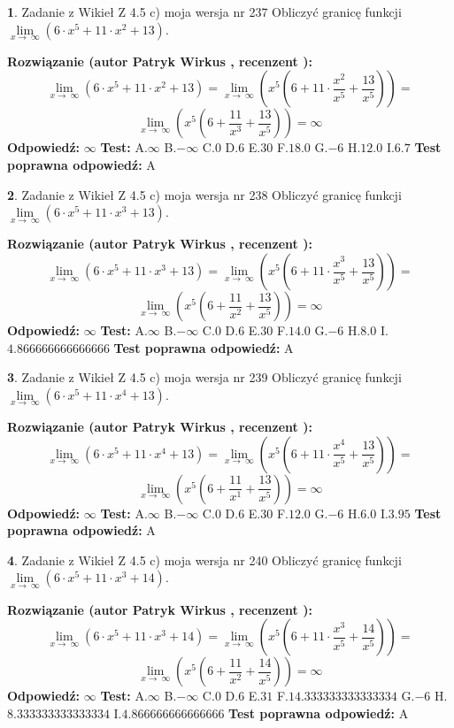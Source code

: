 \documentclass[12pt, a4paper]{article}
\theoremstyle{definition} %
\newtheorem{zad}{}
\newcommand{\zadStart}[1]{\begin{zad}#1\newline}
\newcommand{\zadStop}{\end{zad}}
\newcommand{\rozwStart}[2]{\noindent \textbf{Rozwiązanie (autor #1 , recenzent #2): }\newline}
\newcommand{\rozwStop}{\newline}
\newcommand{\odpStart}{\noindent \textbf{Odpowiedź:}\newline}
\newcommand{\odpStop}{\newline}
\newcommand{\testStart}{\noindent \textbf{Test:}\newline}
\newcommand{\testStop}{\newline}
\newcommand{\kluczStart}{\noindent \textbf{Test poprawna odpowiedź:}\newline}
\newcommand{\kluczStop}{\newline}
\begin{document}
\zadStart{Zadanie z Wikieł Z 4.5 c) moja wersja nr 237}
Obliczyć granicę funkcji  $\lim\limits_{x\to\ \infty}(6 \cdot x^{5}+11 \cdot x^{2}+13)$.
\zadStop
\rozwStart{Patryk Wirkus}{}
$$\lim\limits_{x\to\ \infty}(6 \cdot x^{5}+11 \cdot x^{2}+13) = \lim\limits_{x\to\ \infty}(x^{5}(6 +11 \cdot \frac{x^{2}}{x^{5}}+\frac{13}{x^{5}})) =$$ $$\lim\limits_{x\to\ \infty}(x^{5}(6 +\frac{11}{x^{3}}+\frac{13}{x^{5}})) =\infty$$
\rozwStop
\odpStart
$\infty$
\odpStop
\testStart
A.$\infty$ B.$-\infty$ C.$0$ D.$6$ E.$30$
F.$18.0$ G.$-6$
H.$12.0$
I.$6.7$
\testStop
\kluczStart
A
\kluczStop



\zadStart{Zadanie z Wikieł Z 4.5 c) moja wersja nr 238}
Obliczyć granicę funkcji  $\lim\limits_{x\to\ \infty}(6 \cdot x^{5}+11 \cdot x^{3}+13)$.
\zadStop
\rozwStart{Patryk Wirkus}{}
$$\lim\limits_{x\to\ \infty}(6 \cdot x^{5}+11 \cdot x^{3}+13) = \lim\limits_{x\to\ \infty}(x^{5}(6 +11 \cdot \frac{x^{3}}{x^{5}}+\frac{13}{x^{5}})) =$$ $$\lim\limits_{x\to\ \infty}(x^{5}(6 +\frac{11}{x^{2}}+\frac{13}{x^{5}})) =\infty$$
\rozwStop
\odpStart
$\infty$
\odpStop
\testStart
A.$\infty$ B.$-\infty$ C.$0$ D.$6$ E.$30$
F.$14.0$ G.$-6$
H.$8.0$
I.$4.866666666666666$
\testStop
\kluczStart
A
\kluczStop



\zadStart{Zadanie z Wikieł Z 4.5 c) moja wersja nr 239}
Obliczyć granicę funkcji  $\lim\limits_{x\to\ \infty}(6 \cdot x^{5}+11 \cdot x^{4}+13)$.
\zadStop
\rozwStart{Patryk Wirkus}{}
$$\lim\limits_{x\to\ \infty}(6 \cdot x^{5}+11 \cdot x^{4}+13) = \lim\limits_{x\to\ \infty}(x^{5}(6 +11 \cdot \frac{x^{4}}{x^{5}}+\frac{13}{x^{5}})) =$$ $$\lim\limits_{x\to\ \infty}(x^{5}(6 +\frac{11}{x^{1}}+\frac{13}{x^{5}})) =\infty$$
\rozwStop
\odpStart
$\infty$
\odpStop
\testStart
A.$\infty$ B.$-\infty$ C.$0$ D.$6$ E.$30$
F.$12.0$ G.$-6$
H.$6.0$
I.$3.95$
\testStop
\kluczStart
A
\kluczStop



\zadStart{Zadanie z Wikieł Z 4.5 c) moja wersja nr 240}
Obliczyć granicę funkcji  $\lim\limits_{x\to\ \infty}(6 \cdot x^{5}+11 \cdot x^{3}+14)$.
\zadStop
\rozwStart{Patryk Wirkus}{}
$$\lim\limits_{x\to\ \infty}(6 \cdot x^{5}+11 \cdot x^{3}+14) = \lim\limits_{x\to\ \infty}(x^{5}(6 +11 \cdot \frac{x^{3}}{x^{5}}+\frac{14}{x^{5}})) =$$ $$\lim\limits_{x\to\ \infty}(x^{5}(6 +\frac{11}{x^{2}}+\frac{14}{x^{5}})) =\infty$$
\rozwStop
\odpStart
$\infty$
\odpStop
\testStart
A.$\infty$ B.$-\infty$ C.$0$ D.$6$ E.$31$
F.$14.333333333333334$ G.$-6$
H.$8.333333333333334$
I.$4.866666666666666$
\testStop
\kluczStart
A
\kluczStop
\end{document}
